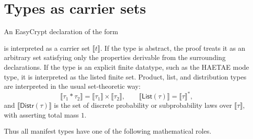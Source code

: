 \section{Types as carrier sets}
\label{app:types-as-carrier-sets}

An EasyCrypt declaration of the form
\begin{center}
\end{center}
is interpreted as a carrier set \(\llbracket t \rrbracket\).  If the type is
abstract, the proof treats it as an arbitrary set satisfying only the
properties derivable from the surrounding declarations.  If the type is an
explicit finite datatype, such as the HAETAE mode type, it is interpreted as the
listed finite set.  Product, list, and distribution types are interpreted in the
usual set-theoretic way:
\[
  \llbracket \tau_1 * \tau_2 \rrbracket
  =
  \llbracket \tau_1 \rrbracket \times \llbracket \tau_2 \rrbracket,
  \qquad
  \llbracket \mathsf{List}(\tau) \rrbracket
  =
  \llbracket \tau \rrbracket^{*},
\]
and \(\llbracket \mathsf{Distr}(\tau) \rrbracket\) is the set of discrete
probability or subprobability laws over \(\llbracket \tau \rrbracket\), with
 asserting total mass \(1\).

Thus all manifest types have one of the following mathematical roles.

